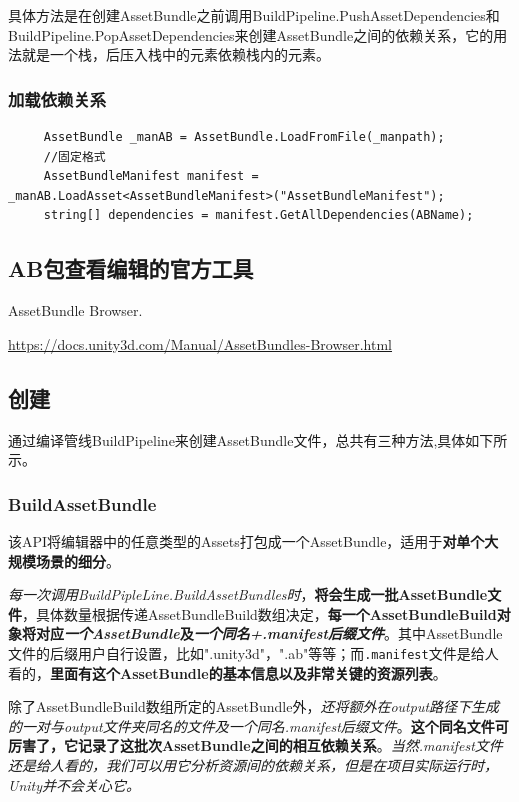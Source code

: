 \documentclass[UTF8,a4paper,12pt]{ctexbook}
\begin{document}
				具体方法是在创建AssetBundle之前调用BuildPipeline.PushAssetDependencies和BuildPipeline.PopAssetDependencies来创建AssetBundle之间的依赖关系，它的用法就是一个栈，后压入栈中的元素依赖栈内的元素。
		
			\subsubsection{加载依赖关系}
				\begin{lstlisting}
	 AssetBundle _manAB = AssetBundle.LoadFromFile(_manpath);
     //固定格式
     AssetBundleManifest manifest = _manAB.LoadAsset<AssetBundleManifest>("AssetBundleManifest");
     string[] dependencies = manifest.GetAllDependencies(ABName);
				\end{lstlisting}
	
	
	
		\subsection{AB包查看编辑的官方工具}
		 AssetBundle Browser.
		 
		 \url{https://docs.unity3d.com/Manual/AssetBundles-Browser.html}
	
	
	
	
				
		\subsection{创建}
			通过编译管线BuildPipeline来创建AssetBundle文件，总共有三种方法,具体如下所示。
			\subsubsection{BuildAssetBundle}
				该API将编辑器中的任意类型的Assets打包成一个AssetBundle，适用于\textbf{对单个大规模场景的细分}。
				
				\textit{每一次调用BuildPipleLine.BuildAssetBundles时}，\textbf{将会生成一批AssetBundle文件}，具体数量根据传递AssetBundleBuild数组决定，\textbf{每一个AssetBundleBuild对象将对应\textit{一个AssetBundle}及\textit{一个同名+.manifest后缀文件}}。其中AssetBundle文件的后缀用户自行设置，比如".unity3d"，".ab"等等；而\verb|.manifest|文件是给人看的，\textbf{里面有这个AssetBundle的基本信息以及非常关键的资源列表}。
				
				除了AssetBundleBuild数组所定的AssetBundle外，\textit{还将额外在output路径下生成的一对与output文件夹同名的文件及一个同名.manifest后缀文件}。\textbf{这个同名文件可厉害了，它记录了这批次AssetBundle之间的相互依赖关系}。\textit{当然.manifest文件还是给人看的，我们可以用它分析资源间的依赖关系，但是在项目实际运行时，Unity并不会关心它。}
				
\end{document}
